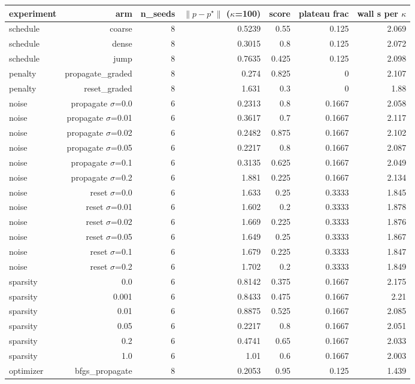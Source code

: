 \begin{tabular}{lrrrrrr}
\toprule
experiment & arm & n\_seeds & $\|p-p^\star\|$ ($\kappa$=100) & score & plateau frac & wall s per $\kappa$ \\
\midrule
schedule & coarse & 8 & 0.5239 & 0.55 & 0.125 & 2.069 \\
schedule & dense & 8 & 0.3015 & 0.8 & 0.125 & 2.072 \\
schedule & jump & 8 & 0.7635 & 0.425 & 0.125 & 2.098 \\
penalty & propagate\_graded & 8 & 0.274 & 0.825 & 0 & 2.107 \\
penalty & reset\_graded & 8 & 1.631 & 0.3 & 0 & 1.88 \\
noise & propagate $\sigma$=0.0 & 6 & 0.2313 & 0.8 & 0.1667 & 2.058 \\
noise & propagate $\sigma$=0.01 & 6 & 0.3617 & 0.7 & 0.1667 & 2.117 \\
noise & propagate $\sigma$=0.02 & 6 & 0.2482 & 0.875 & 0.1667 & 2.102 \\
noise & propagate $\sigma$=0.05 & 6 & 0.2217 & 0.8 & 0.1667 & 2.087 \\
noise & propagate $\sigma$=0.1 & 6 & 0.3135 & 0.625 & 0.1667 & 2.049 \\
noise & propagate $\sigma$=0.2 & 6 & 1.881 & 0.225 & 0.1667 & 2.134 \\
noise & reset $\sigma$=0.0 & 6 & 1.633 & 0.25 & 0.3333 & 1.845 \\
noise & reset $\sigma$=0.01 & 6 & 1.602 & 0.2 & 0.3333 & 1.878 \\
noise & reset $\sigma$=0.02 & 6 & 1.669 & 0.225 & 0.3333 & 1.876 \\
noise & reset $\sigma$=0.05 & 6 & 1.649 & 0.25 & 0.3333 & 1.867 \\
noise & reset $\sigma$=0.1 & 6 & 1.679 & 0.225 & 0.3333 & 1.847 \\
noise & reset $\sigma$=0.2 & 6 & 1.702 & 0.2 & 0.3333 & 1.849 \\
sparsity & 0.0 & 6 & 0.8142 & 0.375 & 0.1667 & 2.175 \\
sparsity & 0.001 & 6 & 0.8433 & 0.475 & 0.1667 & 2.21 \\
sparsity & 0.01 & 6 & 0.8875 & 0.525 & 0.1667 & 2.085 \\
sparsity & 0.05 & 6 & 0.2217 & 0.8 & 0.1667 & 2.051 \\
sparsity & 0.2 & 6 & 0.4741 & 0.65 & 0.1667 & 2.033 \\
sparsity & 1.0 & 6 & 1.01 & 0.6 & 0.1667 & 2.003 \\
optimizer & bfgs\_propagate & 8 & 0.2053 & 0.95 & 0.125 & 1.439 \\

\end{tabular}
